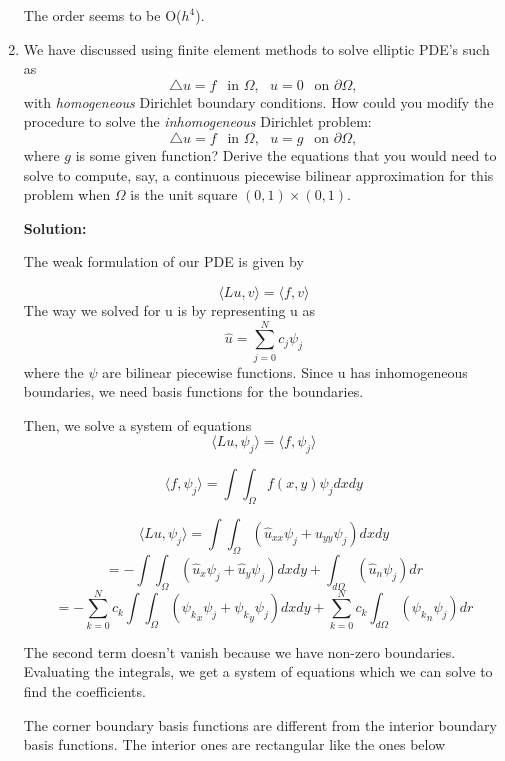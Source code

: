 \documentclass[letterpaper,12pt]{article}
\begin{document}
\begin{enumerate}
The order seems to be O($h^4$).
\item 

We have discussed using finite element methods to solve elliptic PDE's such as 
\[
\bigtriangleup u = f~~\mbox{ in } \Omega ,~~~u = 0~~\mbox{ on } \partial \Omega ,
\]
with {\em homogeneous} Dirichlet boundary conditions.  How could you modify the procedure
to solve the {\em inhomogeneous} Dirichlet problem:
\[
\bigtriangleup u = f~~\mbox{ in } \Omega ,~~~u = g~~\mbox{ on } \partial \Omega ,
\]
where $g$ is some given function?  Derive the equations that you would need to
solve to compute, say, a continuous piecewise bilinear approximation for this problem
when $\Omega$ is the unit square $(0,1) \times (0,1)$.

{\bf Solution:}

The weak formulation of our PDE is given by
 
 \[\langle L u,v\rangle = \langle f,v \rangle \]
  The way we solved for u is by representing u as 
  \[\hat{u} = \sum_{j=0}^{N} c_j \psi_j\]
where the $\psi$ are bilinear piecewise functions. Since u has inhomogeneous boundaries, we need basis functions for the boundaries.

Then, we solve a system of equations
  \[\langle L u,\psi_j\rangle = \langle f,\psi_j \rangle \]

\[\langle f,\psi_j \rangle = \int \int_{\Omega} f(x,y) \psi_j dx dy  \]

\[\langle L u,\psi_j\rangle = \int \int_{\Omega} (\hat{u}_{xx} \psi_j + \hat{u}_{yy}\psi_j)dx dy \]
\[= - \int \int_{\Omega} (\hat{u}_{x}\psi_j + \hat{u}_{y} \psi_j)dx dy + 
\int_{d \Omega} (\hat{u}_{n}\psi_j )dr
\]
\[= - \sum_{k=0}^{N} c_k \int \int_{\Omega} ({\psi_k}_{x}\psi_j + {\psi_k}_{y} \psi_j)dx dy + \sum_{k=0}^{N} c_k 
\int_{d \Omega} ({\psi_k}_{n}\psi_j )dr
\]

The second term doesn't vanish because we have non-zero boundaries. 
Evaluating the integrals, we get a system of equations which we can solve to find the coefficients.

The corner boundary basis functions are different from the interior boundary basis functions.
 The interior ones are rectangular like the ones below 
 

\end{enumerate}
\end{document}
